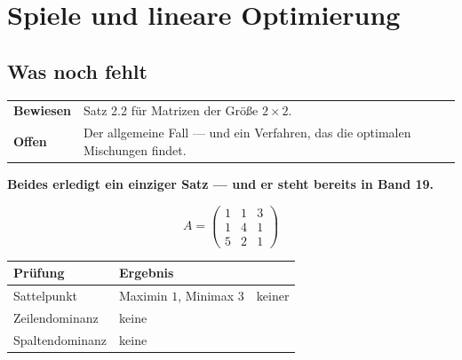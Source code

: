 \chapter{Spiele und lineare Optimierung}

\section{Was noch fehlt}

\begin{merksatz}
\begin{center}
{\small
\renewcommand{\arraystretch}{1.5}
\begin{tabular}{@{}P{2.4cm}P{6.2cm}@{}}
\toprule
\textbf{Bewiesen} & Satz 2.2 für Matrizen der Größe $2\times2$.\\
\textbf{Offen} & Der allgemeine Fall --- und ein Verfahren, das die optimalen Mischungen findet.\\
\bottomrule
\end{tabular}}
\end{center}

\begin{center}
\begin{minipage}{0.9\textwidth}
\textbf{Beides erledigt ein einziger Satz --- und er steht bereits in Band 19.}
\end{minipage}
\end{center}

\[ A = \begin{pmatrix} 1 & 1 & 3\\ 1 & 4 & 1\\ 5 & 2 & 1 \end{pmatrix} \]

\begin{center}
{\small
\renewcommand{\arraystretch}{1.5}
\begin{tabular}{@{}P{2.8cm}P{2.6cm}P{2.2cm}@{}}
\toprule
\textbf{Prüfung} & \textbf{Ergebnis} & \\
\midrule
Sattelpunkt & Maximin $1$, Minimax $3$ & \textcolor{akzent}{keiner}\\
Zeilendominanz & keine & \\
Spaltendominanz & keine & \\
\bottomrule
\end{tabular}}
\end{center}

\begin{center}
\begin{minipage}{0.88\textwidth}
\end{minipage}
\end{center}
\end{merksatz}

